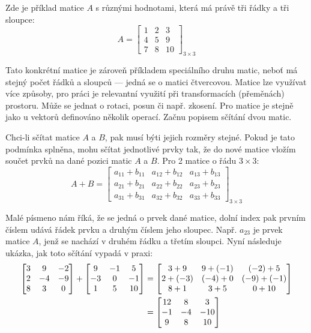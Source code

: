 \documentclass[12pt]{article}
\begin{document}
Zde je příklad matice $A$ s různými hodnotami, která má právě tři řádky a tři sloupce:
\begin{equation}
    A = \begin{bmatrix}
        1 & 2 & 3 \\
        4 & 5 & 9 \\
        7 & 8 & 10
    \end{bmatrix}_{3 \times 3}
\end{equation}

Tato konkrétní matice je zároveň příkladem speciálního druhu matic, neboť má stejný počet řádků a sloupců — jedná se o matici čtvercovou. Matice lze využívat více způsoby, pro práci je relevantní využití při transformacích (přeměnách) prostoru. Může se jednat o rotaci, posun či např. zkosení. Pro matice je stejně jako u vektorů definováno několik operací. Začnu popisem sčítání dvou matic.

Chci-li sčítat matice $A$ a $B$, pak musí býti jejich rozměry stejné. Pokud je tato podmínka splněna, mohu sčítat jednotlivé prvky tak, že do nové matice vložím součet prvků na dané pozici matic $A$ a $B$. Pro 2 matice o řádu $3 \times 3$:
\begin{equation}
    A + B = \begin{bmatrix}
        a_{11} + b_{11} & a_{12} + b_{12} & a_{13} + b_{13} \\
        a_{21} + b_{21} & a_{22} + b_{22} & a_{23} + b_{23} \\
        a_{31} + b_{31} & a_{32} + b_{32} & a_{33} + b_{33}
    \end{bmatrix}_{3 \times 3}
\end{equation}

Malé písmeno nám říká, že se jedná o prvek dané matice, dolní index pak prvním číslem udává řádek prvku a druhým číslem jeho sloupec. Např. $a_{23}$ je prvek matice $A$, jenž se nachází v druhém řádku a třetím sloupci. Nyní následuje ukázka, jak toto sčítání vypadá v praxi:
\begin{align}
    \begin{bmatrix}
        3 & 9 & -2 \\
        2 & -4 & -9 \\
        8 & 3 & 0
    \end{bmatrix} + \begin{bmatrix}
        9 & -1 & 5 \\
        -3 & 0 & -1 \\
        1 & 5 & 10
    \end{bmatrix} &= \begin{bmatrix}
        3 + 9 & 9 + (-1) & (-2) + 5 \\
        2 + (-3) & (-4) + 0 & (-9) + (-1) \\
        8 + 1 & 3 + 5 & 0 + 10
    \end{bmatrix} \notag \\
    &= \begin{bmatrix}
        12 & 8 & 3 \\
        -1 & -4 & -10 \\
        9 & 8 & 10
    \end{bmatrix}
\end{align}
\end{document}
